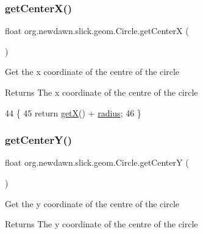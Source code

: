 \subsubsection{\texorpdfstring{get\+Center\+X()}{getCenterX()}}
{\footnotesize\ttfamily float org.\+newdawn.\+slick.\+geom.\+Circle.\+get\+CenterX (\begin{DoxyParamCaption}{ }\end{DoxyParamCaption})\hspace{0.3cm}{\ttfamily [inline]}}

Get the x coordinate of the centre of the circle

\begin{DoxyReturn}{Returns}
The x coordinate of the centre of the circle 
\end{DoxyReturn}

\begin{DoxyCode}
44                               \{
45         \textcolor{keywordflow}{return} \mbox{\hyperlink{classorg_1_1newdawn_1_1slick_1_1geom_1_1_shape_a736a47bfdd6f164558b43fd497a3a3f3}{getX}}() + \mbox{\hyperlink{classorg_1_1newdawn_1_1slick_1_1geom_1_1_circle_a4ca88ec1c6b329912a60e4dd02ccdf5a}{radius}};
46     \}
\end{DoxyCode}
\mbox{\label{classorg_1_1newdawn_1_1slick_1_1geom_1_1_circle_a3e64722eb886a7936ce75199e94e1e48}} 
\subsubsection{\texorpdfstring{get\+Center\+Y()}{getCenterY()}}
{\footnotesize\ttfamily float org.\+newdawn.\+slick.\+geom.\+Circle.\+get\+CenterY (\begin{DoxyParamCaption}{ }\end{DoxyParamCaption})\hspace{0.3cm}{\ttfamily [inline]}}

Get the y coordinate of the centre of the circle

\begin{DoxyReturn}{Returns}
The y coordinate of the centre of the circle 
\end{DoxyReturn}

